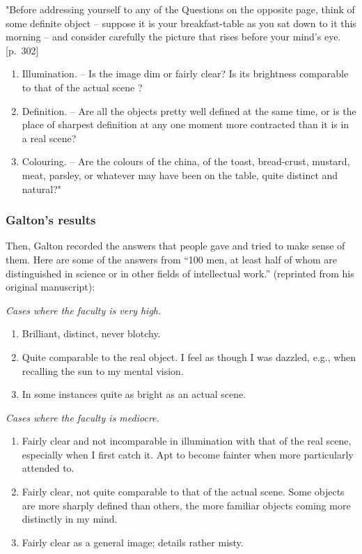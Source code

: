 \documentclass[
  oneside,
  12pt]{crumpbook}
\providecommand{\tightlist}{%
  \setlength{\itemsep}{0pt}\setlength{\parskip}{0pt}}
\begin{document}
"Before addressing yourself to any of the Questions on the opposite page, think of some definite object -- suppose it is your breakfast-table as you sat down to it this morning -- and consider carefully the picture that rises before your mind's eye. {[}p.~302{]}

\begin{enumerate}
\def\labelenumi{\arabic{enumi}.}
\tightlist
\item
  Illumination. -- Is the image dim or fairly clear? Is its brightness comparable to that of the actual scene ?
\item
  Definition. -- Are all the objects pretty well defined at the same time, or is the place of sharpest definition at any one moment more contracted than it is in a real scene?
\item
  Colouring. -- Are the colours of the china, of the toast, bread-crust, mustard, meat, parsley, or whatever may have been on the table, quite distinct and natural?"
\end{enumerate}

\hypertarget{galtons-results}{%
\subsubsection{Galton's results}\label{galtons-results}}

Then, Galton recorded the answers that people gave and tried to make sense of them. Here are some of the answers from ``100 men, at least half of whom are distinguished in science or in other fields of intellectual work.'' (reprinted from his original manuscript):

\emph{Cases where the faculty is very high.}

\begin{enumerate}
\def\labelenumi{\arabic{enumi}.}
\item
  Brilliant, distinct, never blotchy.
\item
  Quite comparable to the real object. I feel as though I was dazzled, e.g., when recalling the sun to my mental vision.
\item
  In some instances quite as bright as an actual scene.
\end{enumerate}

\emph{Cases where the faculty is mediocre.}

\begin{enumerate}
\def\labelenumi{\arabic{enumi}.}
\setcounter{enumi}{45}
\item
  Fairly clear and not incomparable in illumination with that of the real scene, especially when I first catch it. Apt to become fainter when more particularly attended to.
\item
  Fairly clear, not quite comparable to that of the actual scene. Some objects are more sharply defined than others, the more familiar objects coming more distinctly in my mind.
\item
  Fairly clear as a general image; details rather misty.
\end{enumerate}
\end{document}
